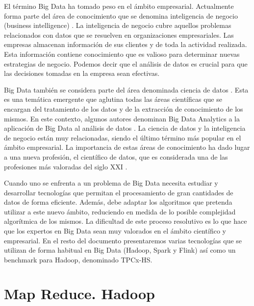 \documentclass[10pt]{article}
\begin{document}
	El término Big Data ha tomado peso en el ámbito empresarial. Actualmente forma parte del área de conocimiento que se denomina inteligencia de negocio (business intelligence) \cite{business-intelligence}. La inteligencia de negocio cubre aquellos problemas relacionados con datos que se resuelven en organizaciones empresariales. Las empresas almacenan información de sus clientes y de toda la actividad realizada. Esta información contiene conocimiento que es valioso para determinar nuevas estrategias de negocio. Podemos decir que el análisis de datos es crucial para que las decisiones tomadas en la empresa sean efectivas. 

	Big Data también se considera parte del área denominada ciencia de datos \cite{data-science}. Esta es una temática emergente que aglutina todas las áreas científicas que se encargan del tratamiento de los datos y de la extracción de conocimiento de los mismos. En este contexto, algunos autores denominan Big Data Analytics a la aplicación de Big Data al análisis de datos \cite{big-data-trends}. La ciencia de datos y la inteligencia de negocio están muy relacionadas, siendo el último término más popular en el ámbito empresarial. La importancia de estas áreas de conocimiento ha dado lugar a una nueva profesión, el científico de datos, que es considerada una de las profesiones más valoradas del siglo XXI \cite{data-scientist}.
	
	Cuando uno se enfrenta a un problema de Big Data necesita estudiar y desarrollar tecnologías que permitan el procesamiento de gran cantidades de datos de forma eficiente. Además, debe adaptar los algoritmos que pretenda utilizar a este nuevo ámbito, reduciendo en medida de lo posible complejidad algorítmica de los mismos. La dificultad de este proceso resolutivo es lo que hace que los expertos en Big Data sean muy valorados en el ámbito científico y empresarial. En el resto del documento presentaremos varias tecnologías que se utilizan de forma habitual en Big Data (Hadoop, Spark y Flink) así como un benchmark para Hadoop, denominado TPCx-HS.
		
	

\section{Map Reduce. Hadoop} \label{sec:mr-hadoop}
\end{document}
